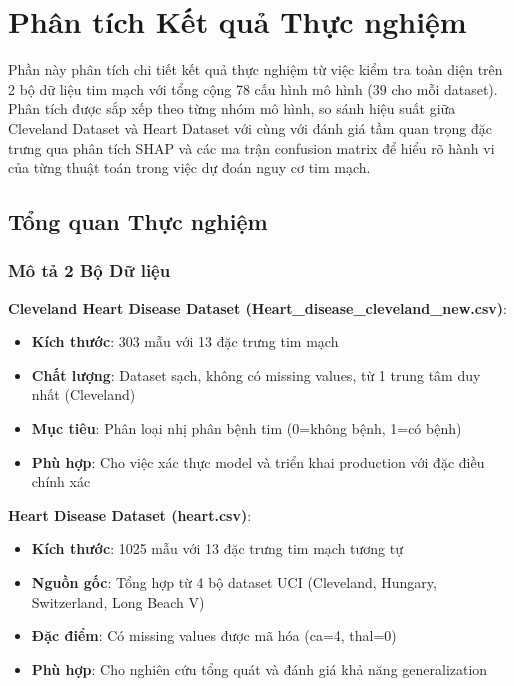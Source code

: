 \section{Phân tích Kết quả Thực nghiệm}\label{sec:ra-detailed-results-analysis}

\noindent
Phần này phân tích chi tiết kết quả thực nghiệm từ việc kiểm tra toàn diện trên 2 bộ dữ liệu tim mạch với tổng cộng 78 cấu hình mô hình (39 cho mỗi dataset). Phân tích được sắp xếp theo từng nhóm mô hình, so sánh hiệu suất giữa Cleveland Dataset và Heart Dataset với cùng với đánh giá tầm quan trọng đặc trưng qua phân tích SHAP và các ma trận confusion matrix để hiểu rõ hành vi của từng thuật toán trong việc dự đoán nguy cơ tim mạch.

\subsection{Tổng quan Thực nghiệm}\label{subsec:ra-experimental-overview}

\subsubsection{Mô tả 2 Bộ Dữ liệu}

\textbf{Cleveland Heart Disease Dataset (Heart\_disease\_cleveland\_new.csv)}:
\begin{itemize}
    \item \textbf{Kích thước}: 303 mẫu với 13 đặc trưng tim mạch
    \item \textbf{Chất lượng}: Dataset sạch, không có missing values, từ 1 trung tâm duy nhất (Cleveland)
    \item \textbf{Mục tiêu}: Phân loại nhị phân bệnh tim (0=không bệnh, 1=có bệnh)
    \item \textbf{Phù hợp}: Cho việc xác thực model và triển khai production với đặc điều chính xác
\end{itemize}

\textbf{Heart Disease Dataset (heart.csv)}:
\begin{itemize}
    \item \textbf{Kích thước}: 1025 mẫu với 13 đặc trưng tim mạch tương tự
    \item \textbf{Nguồn gốc}: Tổng hợp từ 4 bộ dataset UCI (Cleveland, Hungary, Switzerland, Long Beach V)
    \item \textbf{Đặc điểm}: Có missing values được mã hóa (ca=4, thal=0)
    \item \textbf{Phù hợp}: Cho nghiên cứu tổng quát và đánh giá khả năng generalization
\end{itemize}

